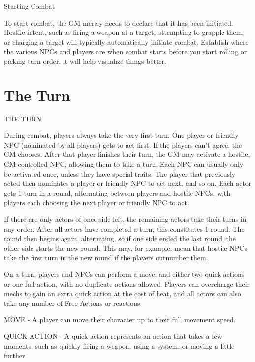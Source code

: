                                               Starting Combat  

To start combat, the GM merely needs to declare that it has been initiated. Hostile intent, such  
as firing a weapon at a target, attempting to grapple them, or charging a target will typically  
automatically initiate combat. Establish where the various NPCs and players are when combat  
starts before you start rolling or picking turn order, it will help visualize things better.  

\chapter{The Turn}
                                                THE TURN  

                                                                                                              


During combat, players always take the very first turn. One player or friendly NPC (nominated  
by all players) gets to act first. If the players can’t agree, the GM chooses. After that player  
finishes their turn, the GM may activate a hostile, GM-controlled NPC, allowing them to take a  
turn. Each NPC can usually only be activated once, unless they have special traits. The player  
that previously acted then nominates a player or friendly NPC to act next, and so on. Each  
actor gets 1 turn in a round, alternating between players and hostile NPCs, with players each  
choosing the next player or friendly NPC to act.
 

If there are only actors of once side left, the remaining actors take their turns in any order. After  
all actors have completed a turn, this constitutes 1 round. The round then begins again,  
alternating, so if one side ended the last round, the other side starts the new round. This may, for  
example, mean that hostile NPCs take the first turn in the new round if the players outnumber  
them.  

On a turn, players and NPCs can perform a move, and either two quick actions or one full  
action, with no duplicate actions allowed. Players can overcharge their mechs to gain an extra  
quick action at the cost of heat, and all actors can also take any number of Free Actions or  
reactions.
 

MOVE - A player can move their character up to their full movement speed.
 
QUICK ACTION - A quick action represents an action that takes a few moments, such as  
quickly firing a weapon, using a system, or moving a little further
 
